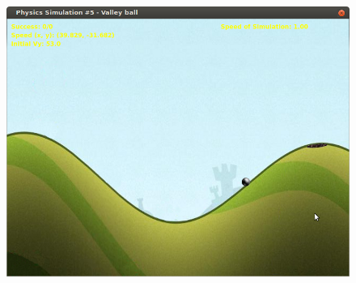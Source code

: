 \documentclass[plainboxedsections]{sciposter}
\begin{document}
\begin{multicols}{2}
\begin{figure}
    \includegraphics[scale=0.6]{valley.png}
  \end{figure}
\end{multicols}
\end{document}
